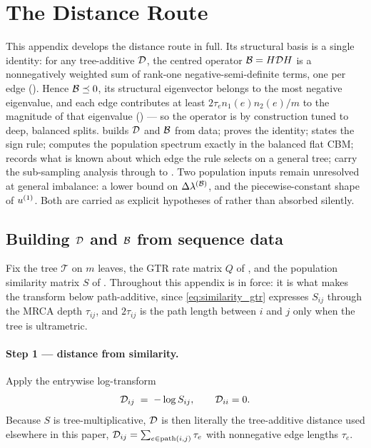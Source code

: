 \section{The Distance Route}\label{app:dist}

This appendix develops the distance route in full. Its structural basis is a
single identity: for any tree-additive $\mathcal{D}$, the centred operator
$\mathcal{B}=H\mathcal{D} H$ is a nonnegatively weighted sum of rank-one
negative-semi-definite terms, one per edge (). Hence
$\mathcal{B}\preceq0$, its structural eigenvector belongs to the most negative
eigenvalue, and each edge contributes at least $2\tau_e n_1(e)n_2(e)/m$ to the
magnitude of that eigenvalue () --- so the operator is by
construction tuned to deep, balanced splits.  builds
$\mathcal{D}$ and $\mathcal{B}$ from data;  proves the identity;
 states the sign rule; 
computes the population spectrum exactly in the balanced flat CBM;
 records what is known about which edge the rule selects
on a general tree;  carry the
sub-sampling analysis through to . Two population inputs
remain unresolved at general imbalance: a lower bound on $\Delta\lambda^{(\mathcal{B})}$, and the
piecewise-constant shape of $u^{(1)}$. Both are carried as explicit hypotheses of
 rather than absorbed silently.

\subsection{Building \texorpdfstring{$\mathcal{D}$}{D} and \texorpdfstring{$\mathcal{B}$}{B} from sequence data}\label{app:dist-build}

Fix the tree $\mathcal T$ on $m$ leaves, the GTR rate matrix $Q$ of
, and the population similarity matrix $S$ of .
Throughout this appendix  is in force: it is what makes the
transform below path-additive, since \eqref{eq:similarity_gtr} expresses $S_{ij}$
through the MRCA depth $\tau_{ij}$, and $2\tau_{ij}$ is the path length between
$i$ and $j$ only when the tree is ultrametric.

\paragraph{Step 1 --- distance from similarity.}
Apply the entrywise log-transform
\begin{equation}\label{eq:dist-def}
   \mathcal{D}_{ij} \;=\; -\log S_{ij}, \qquad \mathcal{D}_{ii}=0.
\end{equation}
Because $S$ is tree-multiplicative, $\mathcal{D}$ is then literally the tree-additive
distance used elsewhere in this paper,
$\mathcal{D}_{ij}=\sum_{e\in\mathrm{path}(i,j)}\tau_e$ with nonnegative edge lengths
$\tau_e$.

